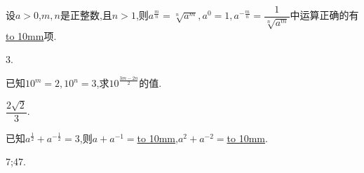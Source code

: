 \documentclass[lang=cn,newtx,10pt,scheme=chinese]{elegantbook}
\begin{document}
\begin{exercise}\label{2017RJA_bx1_P109.2.2}
  设$a>0$,$m,n$是正整数,且$n>1$,则$a^{\frac{m}{n}}=\sqrt[n]{a^m} , a^0=1 , a^{-\frac{m}{n}}=\dfrac{1}{\sqrt[n]{a^m}}$中运算正确的有\underline{\hbox to 10mm{}}项.
\end{exercise}

\begin{solution}
  3.
\end{solution}

\begin{exercise}\label{2017RJA_bx1_P110.7.1}
  已知$10^m=2,10^n=3$,求$10^{\frac{3m-2n}{2}}$的值.
\end{exercise}

\begin{solution}
  $\dfrac{2\sqrt{2}}{3}$.
\end{solution}

\begin{exercise}
  已知$a^\frac12+a^{-\frac12}=3$,则$a+a^{-1}=$\underline{\hbox to 10mm{}},$a^{2}+a^{-2}=$\underline{\hbox to 10mm{}}.
\end{exercise}

\begin{solution}
  7;47.
\end{solution}
\end{document}
